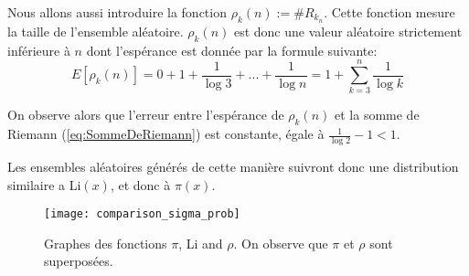 \documentclass[../main.tex]{report}
\begin{document}
Nous allons aussi introduire la fonction $\rho_k(n) := \# R_{k_n}$. Cette fonction mesure la taille de l'ensemble aléatoire.\newline
$\rho_k(n)$ est donc une valeur aléatoire strictement inférieure à $n$ dont l'espérance est donnée par la formule suivante:
\begin{equation}
\label{eq:esperance}
E[\rho_k(n)] = 0 + 1 + \frac{1}{\log 3} + ... + \frac{1}{\log n}
= 1 + \sum_{k=3}^{n} \frac{1}{\log k}
\end{equation}

On observe alors que l'erreur entre l'espérance de $\rho_k(n)$ et la somme de Riemann (\ref{eq:SommeDeRiemann}) est constante, égale à
$\frac{1}{\log 2}- 1 < 1$.

Les ensembles aléatoires générés de cette manière suivront donc une distribution similaire a Li$(x)$, et donc à $\pi(x)$.

\begin{figure}[H]
\texttt{[image: comparison\_sigma\_prob]}
\label{fig:comparison_sigma_prob}
\caption{Graphes des fonctions $\pi$, Li and $\rho$. On observe que $\pi$ et $\rho$ sont superposées.}
\end{figure}

\clearpage
\end{document}
